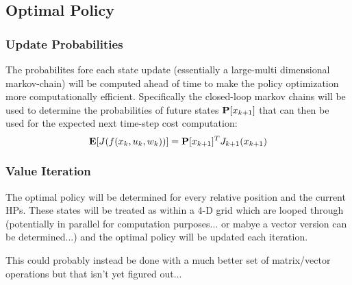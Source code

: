 \documentclass[9pt, onecolumn]{report}
\begin{document}
\subsection{Optimal Policy}
\subsubsection{Update Probabilities}
The probabilites fore each state update (essentially a large-multi dimensional markov-chain) will be computed ahead of time to make the policy optimization more computationally efficient.
Specifically the closed-loop markov chains will be used to determine the probabilities of future states $\vb{P}[x_{k+1}]$ that can then be used for the expected next time-step cost computation: \[
    \vb{E}[J(f(x_k,u_k,w_k))] = \vb{P}[x_{k+1}]^T J_{k+1}(x_{k+1})
\]

\subsubsection{Value Iteration}
The optimal policy will be determined for every relative position and the current HPs.
These states will be treated as within a 4-D grid which are looped through (potentially in parallel for computation purposes... or mabye a vector version can be determined...) and the optimal policy will be updated each iteration.

This could probably instead be done with a much better set of matrix/vector operations but that isn't yet figured out...










% 
% 
\end{document}
